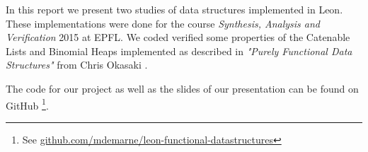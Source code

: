 In this report we present two studies of data structures implemented in Leon. These implementations were done for the course \emph{Synthesis, Analysis and Verification} 2015 at EPFL.
We coded verified some properties of
the Catenable Lists and Binomial Heaps
implemented as described in \emph{"Purely Functional Data Structures"} from Chris Okasaki
\cite{Okasaki}.

The code for our project as well as the slides of our presentation 
can be found on GitHub
\footnote{See \href{https://github.com/mdemarne/leon-functional-datastructures}{github.com/mdemarne/leon-functional-datastructures}}.